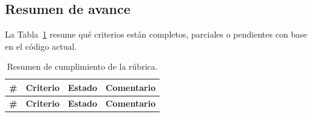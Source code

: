 \documentclass[12pt,a4paper]{article}
\begin{document}
\subsection{Resumen de avance}
La Tabla~\ref{tab:rubrica} resume qué criterios están completos, parciales o pendientes con base en el código actual.

\begin{longtable}{p{1.2cm} p{6cm} p{3cm} p{4.2cm}}
\caption{Resumen de cumplimiento de la rúbrica.}
\label{tab:rubrica}\\
\toprule
\textbf{\#} & \textbf{Criterio} & \textbf{Estado} & \textbf{Comentario} \\
\midrule
\endfirsthead
\toprule
\textbf{\#} & \textbf{Criterio} & \textbf{Estado} & \textbf{Comentario} \\
\midrule
\endhead


\end{longtable}
\end{document}

